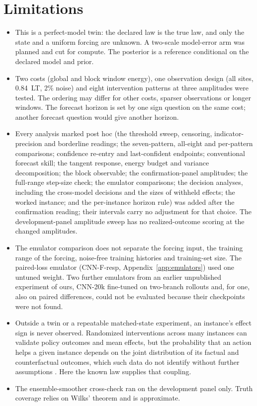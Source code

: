 \documentclass[11pt]{article}
\begin{document}
\section{Limitations}
\begin{itemize}
\item This is a perfect-model twin: the declared law is the true law, and only the state and a uniform forcing are unknown. A two-scale model-error arm was planned and cut for compute. The posterior is a reference conditional on the declared model and prior.
\item Two costs (global and block window energy), one observation design (all sites, 0.84~LT, 2\% noise) and eight intervention patterns at three amplitudes were tested. The ordering may differ for other costs, sparser observations or longer windows. The forecast horizon is set by one sign question on the same cost; another forecast question would give another horizon.
\item Every analysis marked post hoc (the threshold sweep, censoring, indicator-precision and borderline readings; the seven-pattern, all-eight and per-pattern comparisons; confidence re-entry and last-confident endpoints; conventional forecast skill; the tangent response, energy budget and variance decomposition; the block observable; the confirmation-panel amplitudes; the full-range step-size check; the emulator comparisons; the decision analyses, including the cross-model decisions and the sizes of withheld effects; the worked instance; and the per-instance horizon rule) was added after the confirmation reading; their intervals carry no adjustment for that choice. The development-panel amplitude sweep has no realized-outcome scoring at the changed amplitudes.
\item The emulator comparison does not separate the forcing input, the training range of the forcing, noise-free training histories and training-set size. The paired-loss emulator (CNN-F-resp, Appendix~\ref{app:emulators}) used one untuned weight. Two further emulators from an earlier unpublished experiment of ours, CNN-20k fine-tuned on two-branch rollouts and, for one, also on paired differences, could not be evaluated because their checkpoints were not found.
\item Outside a twin or a repeatable matched-state experiment, an instance's effect sign is never observed. Randomized interventions across many instances can validate policy outcomes and mean effects, but the probability that an action helps a given instance depends on the joint distribution of its factual and counterfactual outcomes, which such data do not identify without further assumptions \citep{callaway2020bounds}. Here the known law supplies that coupling.
\item The ensemble-smoother cross-check ran on the development panel only. Truth coverage relies on Wilks' theorem and is approximate.
\end{itemize}
\end{document}
